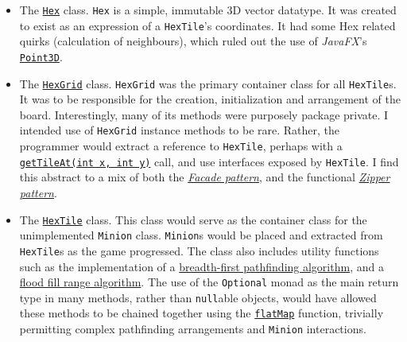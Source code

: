 \documentclass[11pt,a4paper]{report}
\begin{document}
\begin{itemize}
    \item The \href{https://github.com/UQdeco2800/deco2800-2016-pyramidscheme/blob/HexGrid/pyramidscheme/src/main/java/uq/deco2800/pyramidscheme/hexgrid/Hex.java}{\texttt{Hex}} class. \texttt{Hex} is a simple, immutable 3D vector datatype. It was created to exist as an expression of a \texttt{HexTile}'s coordinates. It had some Hex related quirks (calculation of neighbours), which ruled out the use of \textit{JavaFX}'s \href{https://docs.oracle.com/javase/8/javafx/api/javafx/geometry/Point3D.html}{\texttt{Point3D}}.

    \item The \href{https://github.com/UQdeco2800/deco2800-2016-pyramidscheme/blob/HexGrid/pyramidscheme/src/main/java/uq/deco2800/pyramidscheme/hexgrid/HexGrid.java}{\texttt{HexGrid}} class. \texttt{HexGrid} was the primary container class for all \texttt{HexTile}s. It was to be responsible for the creation, initialization and arrangement of the board. Interestingly, many of its methods were purposely package private. I intended use of \texttt{HexGrid} instance methods to be rare. Rather, the programmer would extract a reference to \texttt{HexTile}, perhaps with a \href{https://github.com/UQdeco2800/deco2800-2016-pyramidscheme/blob/HexGrid/pyramidscheme/src/main/java/uq/deco2800/pyramidscheme/hexgrid/HexGrid.java#L73}{\texttt{getTileAt(int x, int y)}} call, and use interfaces exposed by \texttt{HexTile}. I find this abstract to a mix of both the \href{https://en.wikipedia.org/wiki/Facade_pattern}{\textit{Facade pattern}}, and the functional \href{https://wiki.haskell.org/Zipper}{\textit{Zipper pattern}}.

    \item The \href{https://github.com/UQdeco2800/deco2800-2016-pyramidscheme/blob/HexGrid/pyramidscheme/src/main/java/uq/deco2800/pyramidscheme/hexgrid/HexTile.java}{\texttt{HexTile}} class. This class would serve as the container class for the unimplemented \texttt{Minion} class. \texttt{Minion}s would be placed and extracted from \texttt{HexTile}s as the game progressed. The class also includes utility functions such as the implementation of a \href{https://github.com/UQdeco2800/deco2800-2016-pyramidscheme/blob/HexGrid/pyramidscheme/src/main/java/uq/deco2800/pyramidscheme/hexgrid/HexTile.java#L69}{breadth-first pathfinding algorithm}, and a \href{https://github.com/UQdeco2800/deco2800-2016-pyramidscheme/blob/HexGrid/pyramidscheme/src/main/java/uq/deco2800/pyramidscheme/hexgrid/HexTile.java#L107}{flood fill range algorithm}. The use of the \texttt{Optional} monad as the main return type in many methods, rather than \texttt{null}able objects, would have allowed these methods to be chained together using the \href{https://docs.oracle.com/javase/8/docs/api/java/util/stream/Stream.html#flatMap-java.util.function.Function-}{\texttt{flatMap}} function, trivially permitting complex pathfinding arrangements and \texttt{Minion} interactions. 
\end{itemize}
\end{document}
